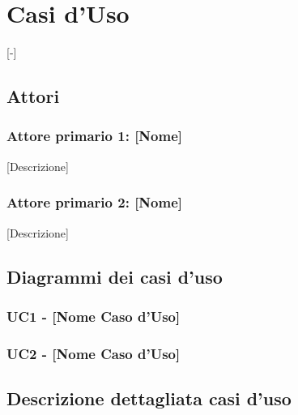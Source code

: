 \section{Casi d'Uso}
[-]

\subsection{Attori}
\subsubsection{Attore primario 1: {[Nome]}}
{[Descrizione]}

\subsubsection{Attore primario 2: {[Nome]}}
{[Descrizione]}

\subsection{Diagrammi dei casi d'uso}

\subsubsection{UC1 - {[Nome Caso d'Uso]}}

\subsubsection{UC2 - {[Nome Caso d'Uso]}}

\newpage
\subsection{Descrizione dettagliata casi d'uso}


